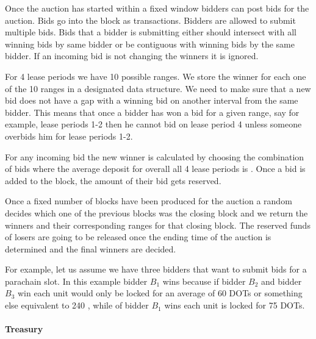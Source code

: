Once the auction has started within a fixed window\eray{}{,} bidders can post bids for the auction.
Bids go into the block as transactions.
Bidders are allowed to submit multiple bids.
Bids that a bidder is submitting either should intersect with all winning bids by same bidder or be contiguous with winning bids by the same bidder.
If an incoming bid is not changing the winners\eray{}{,} it is ignored.

For 4 lease periods\eray{}{,} we have 10 possible ranges.
We store the winner for each one of the 10 ranges in a designated data structure.
We need to make sure that a new bid does not have a gap with a winning bid on another interval from the same bidder.
This means that once a bidder has won a bid for a given range, say for example, lease periods 1-2\eray{}{,}  then he cannot bid on lease period 4 unless someone overbids him for lease periods 1-2.

For any incoming bid\eray{}{,} the new winner is calculated by choosing the combination of bids\eray{}{,} where the average deposit for overall all 4 lease periods is .
Once a bid is added to the block, the amount of their bid gets reserved.

Once a fixed number of blocks have been produced for the auction\eray{}{,} a random  decides which one of the previous blocks was the closing block\eray{}{,} and we return the winners and their corresponding ranges for that closing block.
The reserved funds of losers are going to be released once the ending time of the auction is determined\eray{}{,} and the final winners are decided.

For example, let us assume we have three bidders that want to submit bids for a parachain slot.
In this example bidder $B_1$ wins because if bidder $B_2$ and bidder $B_3$ win each unit would only be locked for an average of 60 DOTs or something else equivalent to 240 , while of bidder $B_1$ wins each unit is locked for 75 DOTs.

 \paragraph{Treasury\eray{}{:}}

